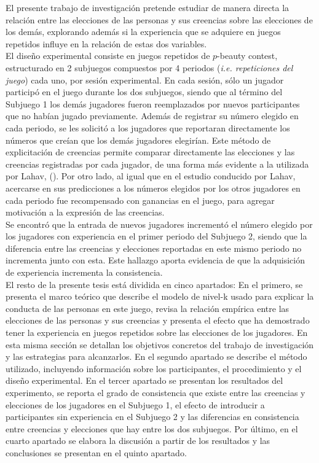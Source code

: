 El presente trabajo de investigación pretende estudiar de manera directa la relación entre las elecciones de las personas y sus creencias sobre las elecciones de los demás, explorando además si la experiencia que se adquiere en juegos repetidos influye en la relación de estas dos variables.\\

El diseño experimental consiste en juegos repetidos de $p$-beauty contest, estructurado en 2 subjuegos compuestos por 4 periodos (\textit{i.e. repeticiones del juego}) cada uno, por sesión experimental. En cada sesión, sólo un jugador participó en el juego durante los dos subjuegos, siendo que al término del Subjuego 1 los demás jugadores fueron reemplazados por nuevos participantes que no habían jugado previamente. Además de registrar su número elegido en cada periodo, se les solicitó a los jugadores que reportaran directamente los números que creían que los demás jugadores elegirían. Este método de explicitación de creencias permite comparar directamente las elecciones y las creencias registradas por cada jugador, de una forma más evidente a la utilizada por Lahav, (\citeyear{Lahav}). Por otro lado, al igual que en el estudio conducido por Lahav, acercarse en sus predicciones a los números elegidos por los otros jugadores en cada periodo fue recompensado con ganancias en el juego, para agregar motivación a la expresión de las creencias.\\

Se encontró que la entrada de nuevos jugadores incrementó el número elegido por los jugadores con experiencia en el primer periodo del Subjuego 2, siendo que la diferencia entre las creencias y elecciones reportadas en este mismo periodo no incrementa junto con esta. Este hallazgo aporta evidencia de que la adquisición de experiencia incrementa la consistencia.\\

El resto de la presente tesis está dividida en cinco apartados: En el primero, se presenta el marco teórico que describe el modelo de nivel-k usado para explicar la conducta de las personas en este juego, revisa la relación empírica entre las elecciones de las personas y sus creencias y presenta el efecto que ha demostrado tener la experiencia en juegos repetidos sobre las elecciones de los jugadores. En esta misma sección se detallan los objetivos concretos del trabajo de investigación y las estrategias para alcanzarlos. En el segundo apartado se describe el método utilizado, incluyendo información sobre los participantes, el procedimiento y el diseño experimental. En el tercer apartado se presentan los resultados del experimento, se reporta el grado de consistencia que existe entre las creencias y elecciones de los jugadores en el Subjuego 1, el efecto de introducir a participantes sin experiencia en el Subjuego 2 y las diferencias en consistencia entre creencias y elecciones que hay entre los dos subjuegos. Por último, en el cuarto apartado se elabora la discusión a partir de los resultados y las conclusiones se presentan en el quinto apartado.\\
